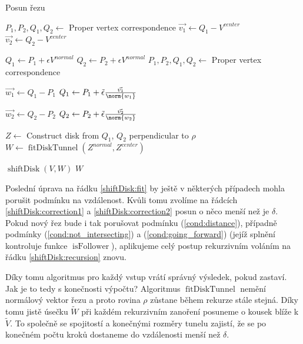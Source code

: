 \begin{algorithm}
\caption{Posun řezu}
\label{alg:shiftDisk}
\begin{algorithmic}[1]

    \State $ P_1, P_2, Q_1, Q_2 \gets $ Proper vertex correspondence
    \State $ \vec{v_1} \gets Q_1 - V^{center} $
    \State $ \vec{v_2} \gets Q_2 - V^{center} $
    \Statex

        \State $ Q_1 \gets P_1 + \epsilon V^{normal} $
        \State $ Q_2 \gets P_2 + \epsilon V^{normal} $
    \EndIf
    \State $ P_1, P_2, Q_1, Q_2 \gets $ Proper vertex correspondence
    \Statex

    \State $ \vec{w_1} \gets Q_1 - P_1 $
        $ Q_1 \gets P_1 + \tilde{\epsilon} \frac{\vec{v_1}}{\norm{w_1}} $ \label{shiftDisk:correction1}
    \EndIf

    \State $ \vec{w_2} \gets Q_2 - P_2 $
        $ Q_2 \gets P_2 + \tilde{\epsilon} \frac{\vec{v_2}}{\norm{w_2}} $ \label{shiftDisk:correction2}
    \EndIf
    \Statex

    \State $ Z \gets $ Construct disk from $ Q_1$, $Q_2$ perpendicular to $ \rho $
    \State $ W \gets \operatorname{fitDiskTunnel}(Z^{normal}, Z^{center}) $ \label{shiftDisk:fit}
    \Statex

        \State \Return $ \operatorname{shiftDisk}(V, W) $ \label{shiftDisk:recursion}
    \Else
        \State \Return $ W $
    \EndIf

\EndFunction

\end{algorithmic}
\end{algorithm}

Poslední úprava na řádku \ref{shiftDisk:fit} by ještě v některých případech mohla
porušit podmínku na vzdálenost. Kvůli tomu zvolíme na řádcích
\ref{shiftDisk:correction1} a \ref{shiftDisk:correction2} posun o něco
menší než je $ \delta $. Pokud nový řez bude i tak porušovat podmínku (\ref{cond:distance}),
případně podmínky (\ref{cond:not_intersecting}) a (\ref{cond:going_forward})
(jejíž splnění kontroluje funkce $ \operatorname{isFollower} $),
aplikujeme celý postup rekurzivním voláním na řádku \ref{shiftDisk:recursion} znovu.

Díky tomu algoritmus pro každý vstup vrátí správný výsledek, pokud zastaví.
Jak je to tedy s konečnosti výpočtu? Algoritmus $\operatorname{fitDiskTunnel} $
nemění normálový vektor řezu a proto
rovina $ \rho $ zůstane během rekurze stále stejná. Díky tomu jistě úsečku
$ \widetilde{W} $ při každém rekurzivním zanoření posuneme o kousek blíže k
$ \widetilde{V} $. To společně se spojitostí a konečnými rozměry tunelu zajistí,
že se po konečném počtu kroků dostaneme do vzdálenosti menší než $ \delta $.

